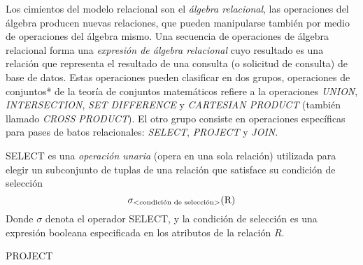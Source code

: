 Los cimientos del modelo relacional son el \emph{álgebra relacional}, las operaciones del álgebra producen nuevas relaciones, que pueden manipularse también por medio de operaciones del álgebra mismo. Una secuencia de operaciones de álgebra relacional forma una \emph{expresión de álgebra relacional} cuyo resultado es una relación que representa el resultado de una consulta (o solicitud de consulta) de base de datos. Estas operaciones pueden clasificar en dos grupos, operaciones de conjuntos* de la teoría de conjuntos matemáticos refiere a la operaciones \emph{UNION}, \emph{INTERSECTION}, \emph{SET DIFFERENCE} y \emph{CARTESIAN PRODUCT} (también llamado \emph{CROSS PRODUCT}). El otro grupo consiste en operaciones específicas para pases de batos relacionales: \emph{SELECT}, \emph{PROJECT} y \emph{JOIN}.

SELECT es una \emph{operación unaria} (opera en una sola relación) utilizada para elegir un subconjunto de tuplas de una relación que satisface su condición de selección
\begin{equation}
\sigma_\text{\textless condición de selección\textgreater}{\text{(R)}}
\end{equation}
Donde $\sigma$ denota el operador SELECT, y la condición de selección es una expresión booleana especificada en los atributos de la relación $R$.

PROJECT